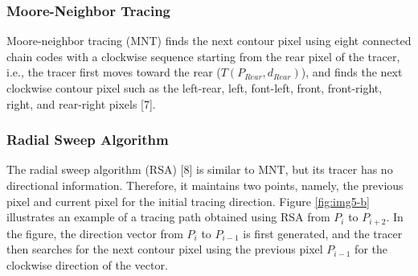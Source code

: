\subsubsection{Moore-Neighbor Tracing}
Moore-neighbor tracing (MNT) finds the next contour pixel using eight connected chain codes with a clockwise sequence starting from the rear pixel of the tracer, i.e., the tracer first moves toward the rear ($T (P_{Rear}, d_{Rear})$), and finds the next clockwise contour pixel such as the left-rear, left, font-left, front, front-right, right, and rear-right pixels [7]. 


\subsubsection{Radial Sweep Algorithm}

The radial sweep algorithm (RSA) [8] is similar to MNT, but its tracer has no directional information. Therefore, it maintains two points, namely, the previous pixel and current pixel for the initial tracing direction. Figure \ref{fig:img5-b} illustrates an example of a tracing path obtained using RSA from $P_i$ to $P_{i+2}$. In the figure, the direction vector from $P_i$ to $P_{i-1}$ is first generated, and the tracer then searches for the next contour pixel using the previous pixel $P_{i-1}$ for the clockwise direction of the vector.


